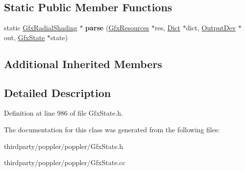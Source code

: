 \subsection*{Static Public Member Functions}
\begin{DoxyCompactItemize}
\item 
\mbox{\label{class_gfx_radial_shading_a333a401ed2402c68e0541bb8dac29075}} 
static \hyperlink{class_gfx_radial_shading}{Gfx\+Radial\+Shading} $\ast$ {\bfseries parse} (\hyperlink{class_gfx_resources}{Gfx\+Resources} $\ast$res, \hyperlink{class_dict}{Dict} $\ast$dict, \hyperlink{class_output_dev}{Output\+Dev} $\ast$out, \hyperlink{class_gfx_state}{Gfx\+State} $\ast$state)
\end{DoxyCompactItemize}
\subsection*{Additional Inherited Members}


\subsection{Detailed Description}


Definition at line 986 of file Gfx\+State.\+h.



The documentation for this class was generated from the following files\+:\begin{DoxyCompactItemize}
\item 
thirdparty/poppler/poppler/Gfx\+State.\+h\item 
thirdparty/poppler/poppler/Gfx\+State.\+cc\end{DoxyCompactItemize}
